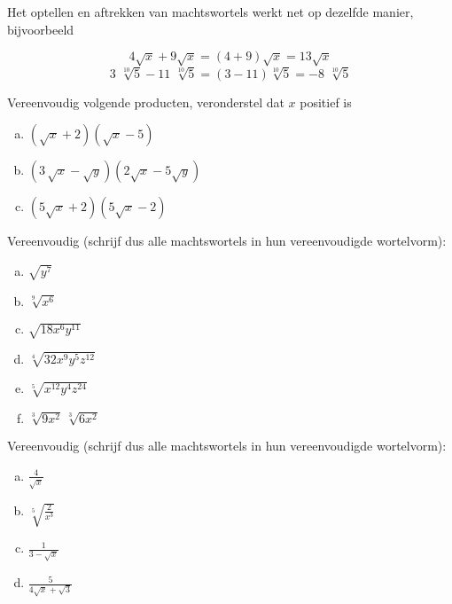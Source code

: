 \documentclass[12pt,twoside]{article}
\begin{document}
Het optellen en aftrekken van machtswortels werkt net op dezelfde manier, bijvoorbeeld

\[4\sqrt x + 9\sqrt x = \left( {4 + 9} \right)\sqrt x = 13\sqrt x\]
\[3\,\,\sqrt[{10}]{5} - 11\,\,\sqrt[{10}]{5} = \left( {3 - 11} \right)\sqrt[{10}]{5} = - 8\,\,\sqrt[{10}]{5}\]

\begin{oefening}
  Vereenvoudig volgende producten, veronderstel dat $x$ positief is
  \begin{enumerate}[(a)]
    \itemsep1em
  \item \(\left( {\sqrt x + 2} \right)\left( {\sqrt x - 5} \right)\)
  \item \(\left( {3\,\sqrt x - \sqrt y } \right)\left( {2\sqrt x - 5\sqrt y } \right)\)
  \item \(\left( {5\sqrt x + 2} \right)\left( {5\sqrt x - 2} \right)\)
  \end{enumerate}
\end{oefening}

\begin{oefening}
  Vereenvoudig (schrijf dus alle machtswortels in hun vereenvoudigde wortelvorm):
  \begin{enumerate}[(a)]
    \itemsep1em
  \item \(\sqrt {{y^7}} \)
  \item \(\sqrt[9]{{{x^6}}}\)
  \item \(\sqrt {18{x^6}{y^{11}}} \)
  \item \(\sqrt[4]{{32{x^9}{y^5}{z^{12}}}}\)
  \item \(\sqrt[5]{{{x^{12}}{y^4}{z^{24}}}}\)
  \item \(\sqrt[3]{{9{x^2}}}\,\sqrt[3]{{6{x^2}}}\)
\end{enumerate}
\end{oefening}

\begin{oefening}
  Vereenvoudig (schrijf dus alle machtswortels in hun vereenvoudigde wortelvorm):
  \begin{enumerate}[(a)]
    \itemsep1em
  \item \( \displaystyle \frac{4}{{\sqrt x }}\)
  \item \( \displaystyle \sqrt[5]{{\frac{2}{{{x^3}}}}}\)
  \item \( \displaystyle \frac{1}{{3 - \sqrt x }}\)
  \item \( \displaystyle \frac{5}{{4\sqrt x + \sqrt 3 }}\)
\end{enumerate}
\end{oefening}
\end{document}
